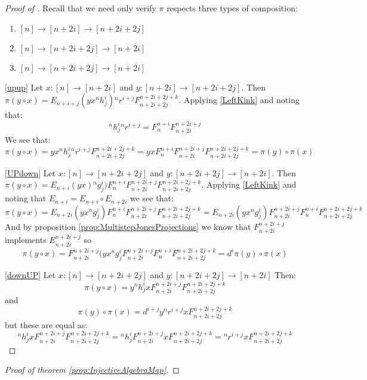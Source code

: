 \documentclass[11pt]{article}
\theoremstyle{plain}
\theoremstyle{definition}
\begin{document}
\begin{proof}[Proof of \label{prop:InjectiveAlgebraMap}]
Recall that we need only verify $\pi$ respects three types of composition:
	\begin{enumerate}
		\item\label{upup}  $[n]\rightarrow [n+2i]\rightarrow [n+2i+2j] $
		\item\label{UPdown} $[n]\rightarrow [n+2i+2j] \rightarrow [n+2i] $
		\item\label{downUP} $[n]\rightarrow [n+2i+2j] \rightarrow [n+2i]$
	\end{enumerate}
\eqref{upup} Let $x:[n]\rightarrow [n+2i]$ and $y:[n+2i]\rightarrow [n+2i+2j]$. Then $\pi(y\circ x)=E_{n+i+j}(yx{}^nh^i_j){}^n r^{i+j}F^{n+2i+2j+k}_{n+2i+2j}$. Applying \ref{LeftKink} and noting that: 
$${}^nh^i_j{}^n r^{i+j}=F^{n+i}_{n}F^{n+2i+j}_{n+2i}$$ 
We see that: $$\pi(y\circ x)=yx{}^nh^i_j{}^n r^{i+j}F^{n+2i+2j+k}_{n+2i+2j}= yxF^{n+i}_{n}F^{n+2i+j}_{n+2i}F^{n+2i+2j+k}_{n+2i+2j}=\pi(y)\circ \pi(x)$$
 
\eqref{UPdown} Let $x:[n]\rightarrow [n+2i+2j]$ and $y:[n+2i+2j]\rightarrow [n+2i]$. Then $\pi(y\circ x)=E_{n+i}(yx){}^ng^i_j)F^{n+i}_{n}F^{n+2i+j}_{n+2i}F^{n+2i+2j+k}_{n+2i+2j}$. Applying \ref{LeftKink} and noting that $E_{n+i}=E_{n+i}\circ E_{n+2i}$ we see that:
$$\pi(y\circ x)= E_{n+2i}(yx{}^ng^i_j)F^{n+i}_{n}F^{n+2i+j}_{n+2i}F^{n+2i+2j+k}_{n+2i+2j}=E_{n+2i}(yx{}^ng^i_j)F^{n+2i+j}_{n+2i}F^{n+i}_{n}F^{n+2i+2j+k}_{n+2i+2j}$$
And by proposition \ref{prop:MultistepJonesProjections} we know that $F^{n+2i+j}_{n+2i}$ implements $E_{n+2i}^{n+2i+j}$ so
$$\pi(y\circ x)= F^{n+2i+j}_{n+2i}(yx{}^ng^i_jF^{n+2i+j}_{n+2i}F^{n+i}_{n}F^{n+2i+2j+k}_{n+2i+2j}=d^i \pi(y) \circ \pi(x)$$

\eqref{downUP} Let $x:[n]\rightarrow [n+2i+2j]$ and $y:[n+2i+2j]\rightarrow [n+2i]$
Then:
$$\pi(y\circ x)=y{}^nh^i_jx F^{n+2i+j}_{n+2i} F^{n+2i+2j+k}_{n+2i+2j} $$
and
$$\pi(y)\circ \pi(x)= d^{i+j}y {}^n r^{i+j} x F^{n+2i+2j+k}_{n+2i+2j}$$
but these are equal as:
$${}^nh^i_jx F^{n+2i+j}_{n+2i} F^{n+2i+2j+k}_{n+2i+2j}= {}^nh^i_j F^{n+2i+j}_{n+2i} x F^{n+2i+2j+k}_{n+2i+2j}= {}^n r^{i+j} x F^{n+2i+2j+k}_{n+2i+2j}$$

\end{proof}

\begin{proof}[Proof of theorem \ref{prop:InjectiveAlgebraMap}]

\end{proof}
\end{document}
